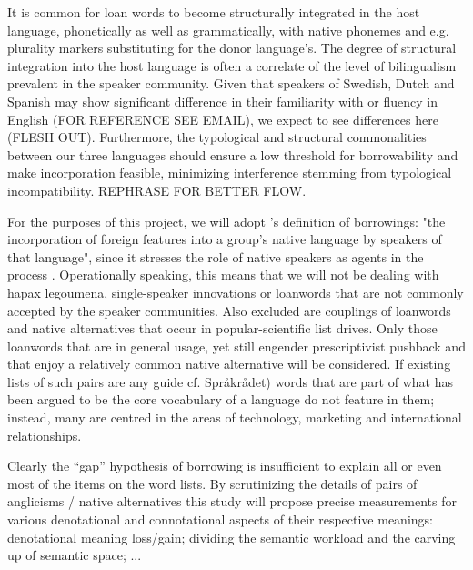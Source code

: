\documentclass[a4paper]{article}
\begin{document}
It is common for loan words to become structurally integrated in the host language, phonetically as well as grammatically, with native phonemes and e.g. plurality markers substituting for the donor language's. The degree of structural integration into the host language is often a correlate of the level of bilingualism prevalent in the speaker community. Given that speakers of Swedish, Dutch and Spanish may show significant difference in their familiarity with or fluency in English (FOR REFERENCE SEE EMAIL), we expect to see differences here (FLESH OUT). Furthermore, the typological and structural commonalities between our three languages should ensure a low threshold for borrowability and make incorporation feasible, minimizing interference stemming from typological incompatibility. REPHRASE FOR BETTER FLOW.

For the purposes of this project, we will adopt \citet[p.37]{Thomason1988}'s definition of borrowings: "the incorporation of foreign features into a group's native language by speakers of that language", since it stresses the role of native speakers as agents in the process \citep[see also][p.12]{Winford2003}. Operationally speaking, this means that we will not be dealing with hapax legoumena, single-speaker innovations or loanwords that are not commonly accepted by the speaker communities. Also excluded are couplings of loanwords and native alternatives that occur in popular-scientific list drives. Only those loanwords that are in general usage, yet still engender prescriptivist pushback and that enjoy a relatively common native alternative will be considered. If existing lists of such pairs are any guide  \citep[cf.][]{Koops2009} cf. Spr\aa kr\aa det) words that are part of what has been argued to be the core vocabulary of a language \citep[see][]{Swadesh1952} do not feature in them; instead, many are centred in the areas of technology, marketing and international relationships. 

Clearly the ``gap'' hypothesis of borrowing is insufficient to explain all or even most of the items on the word lists. By scrutinizing the details of pairs of anglicisms / native alternatives this study will propose precise measurements for various denotational and connotational aspects of their respective meanings: denotational meaning loss/gain; dividing the semantic workload and the carving up of semantic space; ...

\end{document}
